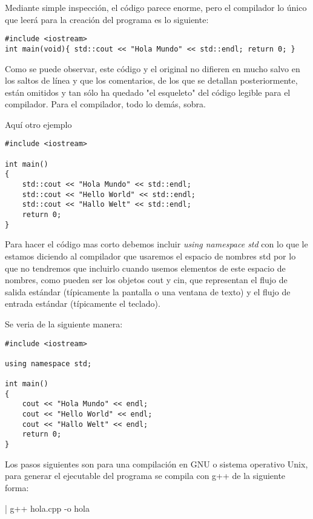 Mediante simple inspección, el código parece enorme, pero el compilador lo único que leerá para la creación del programa es lo siguiente:

\begin{lstlisting}[style=Cpp, label=hola-mundo-compilador, caption=Hola Mundo Compilado]
#include <iostream>
int main(void){ std::cout << "Hola Mundo" << std::endl; return 0; }
\end{lstlisting}

Como se puede observar, este código y el original no difieren en mucho salvo en los saltos de línea y que los comentarios, de los que se detallan posteriormente, están omitidos y tan sólo ha quedado "el esqueleto" del código legible para el compilador. Para el compilador, todo lo demás, sobra.

Aquí otro ejemplo

\begin{lstlisting}[style=Cpp, label=hello-world, caption=Hello World]
#include <iostream>

int main()
{
    std::cout << "Hola Mundo" << std::endl;
    std::cout << "Hello World" << std::endl;
    std::cout << "Hallo Welt" << std::endl;
    return 0;
}
\end{lstlisting}

Para hacer el código mas corto debemos incluir \textit{using namespace std} con lo que le estamos diciendo al compilador que usaremos el espacio de nombres std por lo que no tendremos que incluirlo cuando usemos elementos de este espacio de nombres, como pueden ser los objetos cout y cin, que representan el flujo de salida estándar (típicamente la pantalla o una ventana de texto) y el flujo de entrada estándar (típicamente el teclado).

Se veria de la siguiente manera:

\begin{lstlisting}[style=Cpp, label=using-namespace-std, caption=Using Namespace Std]
#include <iostream>

using namespace std;

int main()
{
    cout << "Hola Mundo" << endl;
    cout << "Hello World" << endl;
    cout << "Hallo Welt" << endl;
    return 0;
}
\end{lstlisting}

Los pasos siguientes son para una compilación en GNU o sistema operativo Unix, para generar el ejecutable del programa se compila con g++ de la siguiente forma:

\begin{listing}[style=consola, numbers=none,label=compilar,caption=Compilar]
| g++ hola.cpp -o hola
\end{listing}

